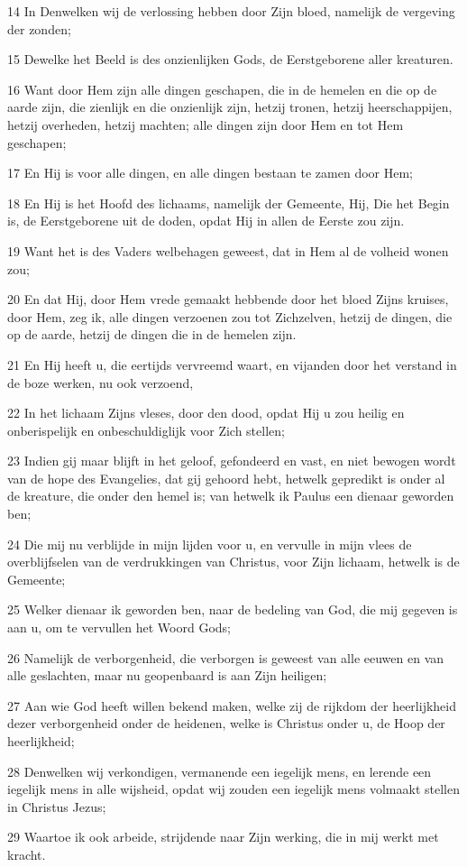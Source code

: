 \par 14 In Denwelken wij de verlossing hebben door Zijn bloed, namelijk de vergeving der zonden;
\par 15 Dewelke het Beeld is des onzienlijken Gods, de Eerstgeborene aller kreaturen.
\par 16 Want door Hem zijn alle dingen geschapen, die in de hemelen en die op de aarde zijn, die zienlijk en die onzienlijk zijn, hetzij tronen, hetzij heerschappijen, hetzij overheden, hetzij machten; alle dingen zijn door Hem en tot Hem geschapen;
\par 17 En Hij is voor alle dingen, en alle dingen bestaan te zamen door Hem;
\par 18 En Hij is het Hoofd des lichaams, namelijk der Gemeente, Hij, Die het Begin is, de Eerstgeborene uit de doden, opdat Hij in allen de Eerste zou zijn.
\par 19 Want het is des Vaders welbehagen geweest, dat in Hem al de volheid wonen zou;
\par 20 En dat Hij, door Hem vrede gemaakt hebbende door het bloed Zijns kruises, door Hem, zeg ik, alle dingen verzoenen zou tot Zichzelven, hetzij de dingen, die op de aarde, hetzij de dingen die in de hemelen zijn.
\par 21 En Hij heeft u, die eertijds vervreemd waart, en vijanden door het verstand in de boze werken, nu ook verzoend,
\par 22 In het lichaam Zijns vleses, door den dood, opdat Hij u zou heilig en onberispelijk en onbeschuldiglijk voor Zich stellen;
\par 23 Indien gij maar blijft in het geloof, gefondeerd en vast, en niet bewogen wordt van de hope des Evangelies, dat gij gehoord hebt, hetwelk gepredikt is onder al de kreature, die onder den hemel is; van hetwelk ik Paulus een dienaar geworden ben;
\par 24 Die mij nu verblijde in mijn lijden voor u, en vervulle in mijn vlees de overblijfselen van de verdrukkingen van Christus, voor Zijn lichaam, hetwelk is de Gemeente;
\par 25 Welker dienaar ik geworden ben, naar de bedeling van God, die mij gegeven is aan u, om te vervullen het Woord Gods;
\par 26 Namelijk de verborgenheid, die verborgen is geweest van alle eeuwen en van alle geslachten, maar nu geopenbaard is aan Zijn heiligen;
\par 27 Aan wie God heeft willen bekend maken, welke zij de rijkdom der heerlijkheid dezer verborgenheid onder de heidenen, welke is Christus onder u, de Hoop der heerlijkheid;
\par 28 Denwelken wij verkondigen, vermanende een iegelijk mens, en lerende een iegelijk mens in alle wijsheid, opdat wij zouden een iegelijk mens volmaakt stellen in Christus Jezus;
\par 29 Waartoe ik ook arbeide, strijdende naar Zijn werking, die in mij werkt met kracht.

